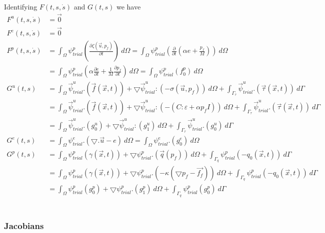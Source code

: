 Identifying $F(t,s,\dot{s})$ and $G(t,s)$ we have 
\begin{align}
F^u(t,s,\dot{s}) &= \vec{0} \\
F^e(t,s,\dot{s}) &= \vec{0} \\
F^p(t,s,\dot{s}) &= \int_{\Omega} \psi_{trial}^p (\frac{\partial \zeta (\vec{u},p_f)}{\partial t}) \ d\Omega = \int_{\Omega} \psi_{trial}^p (\frac{\partial}{\partial t}(\alpha e + \frac{p_f}{M})) \ d\Omega \\
&= \int_{\Omega} \psi_{trial}^p (\alpha \frac{\partial e}{\partial t} + \frac{1}{M} \frac{\partial p_f}{\partial t}) \ d\Omega = \int_{\Omega} \psi_{trial}^p (f_0^p) \ d\Omega \\
G^u(t,s) &= \int_{\Omega} \vec{\psi}_{trial}^u . (\vec{f}(\vec{x},t)) + \bigtriangledown \vec{\psi}_{trial}^u : (-\sigma(\vec{u},p_f)) \ d\Omega + \int_{\Gamma_{\tau}} \vec{\psi}_{trial}^u . (\vec{\tau}(\vec{x},t)) \ d\Gamma \\
&= \int_{\Omega} \vec{\psi}_{trial}^u . (\vec{f}(\vec{x},t)) + \bigtriangledown \vec{\psi}_{trial}^u : (-(C:\varepsilon+\alpha p_f I)) \ d\Omega + \int_{\Gamma_{\tau}} \vec{\psi}_{trial}^u . (\vec{\tau}(\vec{x},t)) \ d\Gamma \\
&= \int_{\Omega} \vec{\psi}_{trial}^u . (g_0^u) + \bigtriangledown \vec{\psi}_{trial}^u : (g_1^u) \ d\Omega + \int_{\Gamma_{\tau}} \vec{\psi}_{trial}^u . (g_0^u) \ d\Gamma \\
G^e(t,s) &= \int_{\Omega} \psi_{trial}^e .(\bigtriangledown . \vec{u} - e) \ d\Omega = \int_{\Omega} \psi_{trial}^e . (g_0^e) \ d\Omega \\
G^p(t,s) &= \int_{\Omega} \psi_{trial}^p (\gamma(\vec{x},t)) + \bigtriangledown \psi_{trial}^p . (\vec{q}(p_f)) \ d\Omega + \int_{\Gamma_q} \psi_{trial}^p (-q_0(\vec{x},t)) \ d\Gamma \\
&= \int_{\Omega} \psi_{trial}^p (\gamma(\vec{x},t)) + \bigtriangledown \psi_{trial}^p . (-\kappa (\bigtriangledown p_f - \vec{f_f})) \ d\Omega + \int_{\Gamma_q} \psi_{trial}^p (-q_0(\vec{x},t)) \ d\Gamma \\
&= \int_{\Omega} \psi_{trial}^p (g_0^p) + \bigtriangledown \psi_{trial}^p . (g_1^p) \ d\Omega + \int_{\Gamma_q} \psi_{trial}^p (g_0^p) \ d\Gamma &&
\end{align} \\ 

\subsubsection{Jacobians}

